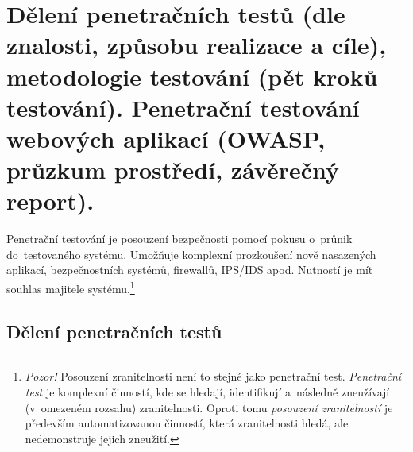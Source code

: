 \begin{figure}[ht]
    \centering
\end{figure}

\clearpage

\section{Dělení penetračních testů (dle znalosti, způsobu realizace a cíle), metodologie testování (pět kroků testování). Penetrační testování webových aplikací (OWASP, průzkum prostředí, závěrečný report).}

Penetrační testování je posouzení bezpečnosti pomocí pokusu o~průnik do~testovaného systému. Umožňuje komplexní prozkoušení nově nasazených aplikací, bezpečnostních systémů, firewallů, IPS/IDS apod. Nutností je mít souhlas majitele systému.\footnote{\textit{Pozor!} Posouzení zranitelnosti není to stejné jako penetrační test. \textit{Penetrační test} je komplexní činností, kde se hledají, identifikují a~následně zneužívají (v~omezeném rozsahu) zranitelnosti. Oproti tomu \textit{posouzení zranitelností} je především automatizovanou činností, která zranitelnosti hledá, ale nedemonstruje jejich zneužití.}

\subsection{Dělení penetračních testů}

